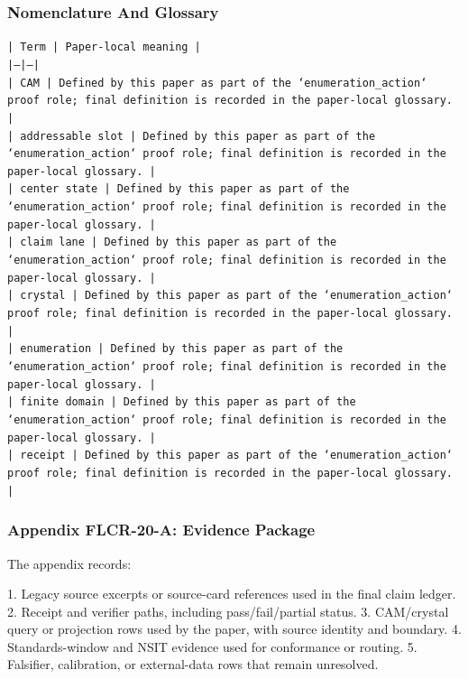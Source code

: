 \documentclass[11pt]{article}
\begin{document}
\subsubsection*{Nomenclature And Glossary}

\noindent\texttt{| Term | Paper-local meaning |}\\
\noindent\texttt{|---|---|}\\
\noindent\texttt{| CAM | Defined by this paper as part of the `enumeration\_action` proof role; final definition is recorded in the paper-local glossary. |}\\
\noindent\texttt{| addressable slot | Defined by this paper as part of the `enumeration\_action` proof role; final definition is recorded in the paper-local glossary. |}\\
\noindent\texttt{| center state | Defined by this paper as part of the `enumeration\_action` proof role; final definition is recorded in the paper-local glossary. |}\\
\noindent\texttt{| claim lane | Defined by this paper as part of the `enumeration\_action` proof role; final definition is recorded in the paper-local glossary. |}\\
\noindent\texttt{| crystal | Defined by this paper as part of the `enumeration\_action` proof role; final definition is recorded in the paper-local glossary. |}\\
\noindent\texttt{| enumeration | Defined by this paper as part of the `enumeration\_action` proof role; final definition is recorded in the paper-local glossary. |}\\
\noindent\texttt{| finite domain | Defined by this paper as part of the `enumeration\_action` proof role; final definition is recorded in the paper-local glossary. |}\\
\noindent\texttt{| receipt | Defined by this paper as part of the `enumeration\_action` proof role; final definition is recorded in the paper-local glossary. |}\\

\subsubsection*{Appendix FLCR-20-A: Evidence Package}

The appendix records:

1. Legacy source excerpts or source-card references used in the final claim ledger.
2. Receipt and verifier paths, including pass/fail/partial status.
3. CAM/crystal query or projection rows used by the paper, with source identity and boundary.
4. Standards-window and NSIT evidence used for conformance or routing.
5. Falsifier, calibration, or external-data rows that remain unresolved.
\end{document}

